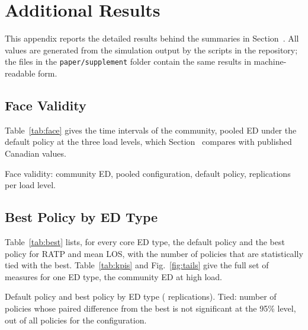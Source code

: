\section{Additional Results}
\label{app:results}

This appendix reports the detailed results behind the summaries in Section~. All values are generated from the simulation output by the scripts in the repository; the files in the \texttt{paper/supplement} folder contain the same results in machine-readable form.

\subsection{Face Validity}
\label{app:res:face}

Table~\ref{tab:face} gives the time intervals of the community, pooled ED under the default policy at the three load levels, which Section~ compares with published Canadian values.

\begin{table}[!htbp]
\centering
\caption{Face validity: community ED, pooled configuration, default policy, \Reps{} replications per load level.}
\label{tab:face}
\footnotesize
\begin{adjustbox}{max width=\linewidth}\end{adjustbox}
\end{table}

\subsection{Best Policy by ED Type}
\label{app:res:best}

Table~\ref{tab:best} lists, for every core ED type, the default policy and the best policy for RATP and mean LOS, with the number of policies that are statistically tied with the best. Table~\ref{tab:kpis} and Fig.~\ref{fig:tails} give the full set of measures for one ED type, the community ED at high load.

\begin{table}[!t]
\centering
\caption{Default policy and best policy by ED type (\Reps{} replications). Tied: number of policies whose paired difference from the best is not significant at the 95\% level, out of all policies for the configuration.}
\label{tab:best}
\scriptsize
\setlength{\tabcolsep}{3pt}
\begin{adjustbox}{max width=\linewidth}\end{adjustbox}
\end{table}


